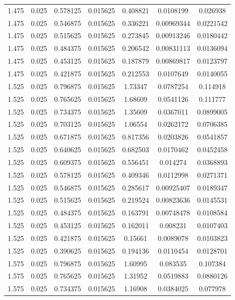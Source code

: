 \begin{flushleft}
\begin{longtable}{ccccccc}
1.475 & 0.025 & 0.578125 & 0.015625 & 0.408821 & 0.0108199 & 0.026938  \\ 
1.475 & 0.025 & 0.546875 & 0.015625 & 0.336221 & 0.00969344 & 0.0221542  \\ 
1.475 & 0.025 & 0.515625 & 0.015625 & 0.273845 & 0.00913246 & 0.0180442  \\ 
1.475 & 0.025 & 0.484375 & 0.015625 & 0.206542 & 0.00831113 & 0.0136094  \\ 
1.475 & 0.025 & 0.453125 & 0.015625 & 0.187879 & 0.00869817 & 0.0123797  \\ 
1.475 & 0.025 & 0.421875 & 0.015625 & 0.212553 & 0.0107649 & 0.0140055  \\ 
1.525 & 0.025 & 0.796875 & 0.015625 & 1.73347 & 0.0787254 & 0.114918  \\ 
1.525 & 0.025 & 0.765625 & 0.015625 & 1.68609 & 0.0541126 & 0.111777  \\ 
1.525 & 0.025 & 0.734375 & 0.015625 & 1.35609 & 0.0367011 & 0.0899005  \\ 
1.525 & 0.025 & 0.703125 & 0.015625 & 1.06554 & 0.0262172 & 0.0706385  \\ 
1.525 & 0.025 & 0.671875 & 0.015625 & 0.817356 & 0.0203826 & 0.0541857  \\ 
1.525 & 0.025 & 0.640625 & 0.015625 & 0.682503 & 0.0170462 & 0.0452458  \\ 
1.525 & 0.025 & 0.609375 & 0.015625 & 0.556451 & 0.014274 & 0.0368893  \\ 
1.525 & 0.025 & 0.578125 & 0.015625 & 0.409346 & 0.0112998 & 0.0271371  \\ 
1.525 & 0.025 & 0.546875 & 0.015625 & 0.285617 & 0.00925407 & 0.0189347  \\ 
1.525 & 0.025 & 0.515625 & 0.015625 & 0.219524 & 0.00823636 & 0.0145531  \\ 
1.525 & 0.025 & 0.484375 & 0.015625 & 0.163791 & 0.00748478 & 0.0108584  \\ 
1.525 & 0.025 & 0.453125 & 0.015625 & 0.162011 & 0.008231 & 0.0107403  \\ 
1.525 & 0.025 & 0.421875 & 0.015625 & 0.15661 & 0.0089078 & 0.0103823  \\ 
1.525 & 0.025 & 0.390625 & 0.015625 & 0.194136 & 0.0110454 & 0.0128701  \\ 
1.575 & 0.025 & 0.796875 & 0.015625 & 1.60995 & 0.083535 & 0.107384  \\ 
1.575 & 0.025 & 0.765625 & 0.015625 & 1.31952 & 0.0519883 & 0.0880126  \\ 
1.575 & 0.025 & 0.734375 & 0.015625 & 1.16908 & 0.0384025 & 0.077978  \\ 

\end{longtable}
\end{flushleft}
